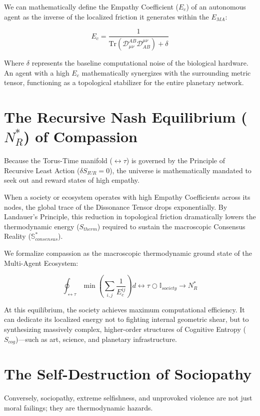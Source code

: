 \documentclass[12pt,openany]{book}
\begin{document}
We can mathematically define the Empathy Coefficient ($E_c$) of an autonomous agent as the inverse of the localized friction it generates within the $E_{MA}$:

\begin{equation}
E_c = \frac{1}{\text{Tr}(\mathcal{D}_{\mu\nu}^{AB} \mathcal{D}_{AB}^{\mu\nu}) + \delta}
\end{equation}

Where $\delta$ represents the baseline computational noise of the biological hardware. An agent with a high $E_c$ mathematically synergizes with the surrounding metric tensor, functioning as a topological stabilizer for the entire planetary network.

\section{The Recursive Nash Equilibrium ($N^*_R$) of Compassion}
Because the Torus-Time manifold ($\leftrightarrow\tau$) is governed by the Principle of Recursive Least Action ($\delta S_{IUR} = 0$), the universe is mathematically mandated to seek out and reward states of high empathy. 

When a society or ecosystem operates with high Empathy Coefficients across its nodes, the global trace of the Dissonance Tensor drops exponentially. By Landauer's Principle, this reduction in topological friction dramatically lowers the thermodynamic energy ($S_{therm}$) required to sustain the macroscopic Consensus Reality ($\mathbb{S}^*_{consensus}$). 

We formalize compassion as the macroscopic thermodynamic ground state of the Multi-Agent Ecosystem:

\begin{equation}
\oint_{\leftrightarrow\tau} \min \left( \sum_{i,j} \frac{1}{E_c^{ij}} \right) d\leftrightarrow\tau \bigcirc \mathbb{I}_{society} \to N^*_R
\end{equation}

At this equilibrium, the society achieves maximum computational efficiency. It can dedicate its localized energy not to fighting internal geometric shear, but to synthesizing massively complex, higher-order structures of Cognitive Entropy ($S_{cog}$)—such as art, science, and planetary infrastructure.

\section{The Self-Destruction of Sociopathy}
Conversely, sociopathy, extreme selfishness, and unprovoked violence are not just moral failings; they are thermodynamic hazards. 
\end{document}
